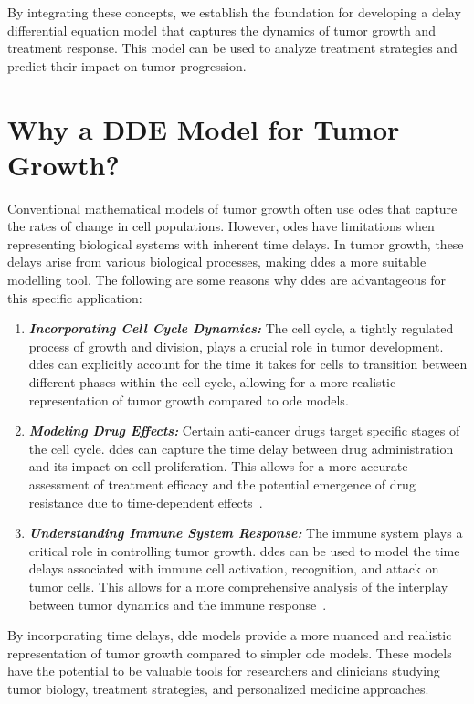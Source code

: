 By integrating these concepts, we establish the foundation for developing a delay differential equation model that captures the dynamics of tumor growth and treatment response. This model can be used to analyze treatment strategies and predict their impact on tumor progression.

\section{Why a DDE Model for Tumor Growth?}

Conventional mathematical models of tumor growth often use \gls{ode}s that capture the rates of change in cell populations. However, \gls{ode}s have limitations when representing biological systems with inherent time delays. In tumor growth, these delays arise from various biological processes, making \gls{dde}s a more suitable modelling tool. The following are some reasons why \gls{dde}s are advantageous for this specific application:

\begin{enumerate}
    \item \textbf{\textit{Incorporating Cell Cycle Dynamics:}} The cell cycle, a tightly regulated process of growth and division, plays a crucial role in tumor development. \gls{dde}s can explicitly account for the time it takes for cells to transition between different phases within the cell cycle, allowing for a more realistic representation of tumor growth compared to \gls{ode} models.

    \item \textbf{\textit{Modeling Drug Effects:}} Certain anti-cancer drugs target specific stages of the cell cycle. \gls{dde}s can capture the time delay between drug administration and its impact on cell proliferation. This allows for a more accurate assessment of treatment efficacy and the potential emergence of drug resistance due to time-dependent effects~\cite{Zaccagnino2017}.

    \item \textbf{\textit{Understanding Immune System Response:}} The immune system plays a critical role in controlling tumor growth. \gls{dde}s can be used to model the time delays associated with immune cell activation, recognition, and attack on tumor cells. This allows for a more comprehensive analysis of the interplay between tumor dynamics and the immune response~\cite{Butner2022}.
\end{enumerate}

By incorporating time delays, \gls{dde} models provide a more nuanced and realistic representation of tumor growth compared to simpler \gls{ode} models. These models have the potential to be valuable tools for researchers and clinicians studying tumor biology, treatment strategies, and personalized medicine approaches.
